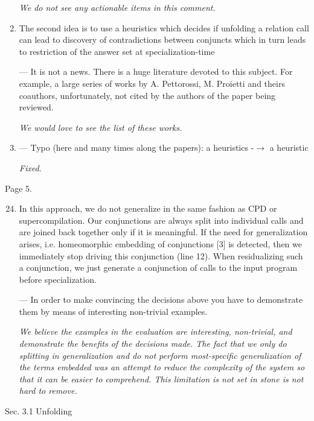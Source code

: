 \begin{enumerate}
{    \emph{We do not see any actionable items in this comment.}
  }

  \item{
    The second idea is to use a heuristics which decides if unfolding a relation call can lead to discovery of contradictions between conjuncts which in turn leads to restriction of the answer set at specialization-time

    --- It is not a news. There is a huge literature devoted to this subject. For example, a large series of works by A. Pettorossi, M. Proietti and theirs coauthors, unfortunately, not cited by the authors of the paper being reviewed.

    \emph{We would love to see the list of these works.}
  }

  \item{ --- Typo (here and many times along the papers): a heuristics -$\to$ a heuristic

  \emph{Fixed.}
  }

\end{enumerate}

Page 5.

\begin{enumerate}
  \setcounter{enumi}{23}
  \item {
    In this approach, we do not generalize in the same fashion as CPD or supercompilation. Our conjunctions are always split into individual calls and are joined back together only if it is meaningful. If the need for generalization arises, i.e. homeomorphic embedding of conjunctions [3] is detected, then we immediately stop driving this conjunction (line 12). When residualizing such a conjunction, we just generate a conjunction of calls to the input program before specialization.

    --- In order to make convincing the decisions above you have to demonstrate them by means of interesting non-trivial examples.

    \emph{We believe the examples in the evaluation are  interesting, non-trivial, and demonstrate the benefits of the decisions made. The fact that we only do splitting in generalization and do not perform most-specific generalization of the terms embedded was an attempt to reduce the complexity of the system so that it can be easier to comprehend. This limitation is not set in stone is not hard to remove. }

  }
\end{enumerate}

Sec. 3.1 Unfolding

